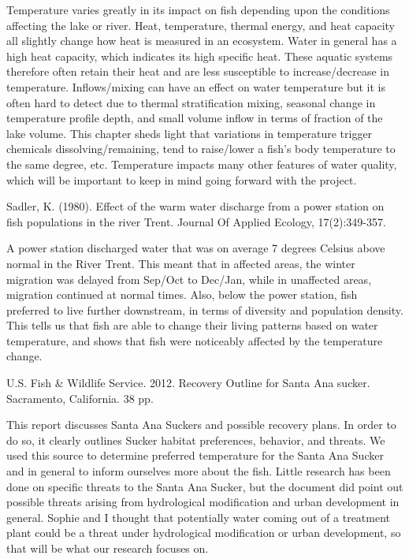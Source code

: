 \documentclass{article}
\begin{document}
Temperature varies greatly in its impact on fish depending upon the conditions affecting the lake or river. Heat, temperature, thermal energy, and heat capacity all slightly change how heat is measured in an ecosystem. Water in general has a high heat capacity, which indicates its high specific heat. These aquatic systems therefore often retain their heat and are less susceptible to increase/decrease in temperature. Inflows/mixing can have an effect on water temperature but it is often hard to detect due to thermal stratification mixing, seasonal change in temperature profile depth, and small volume inflow in terms of fraction of the lake volume. This chapter sheds light that variations in temperature trigger chemicals dissolving/remaining, tend to raise/lower a fish’s body temperature to the same degree, etc. Temperature impacts many other features of water quality, which will be important to keep in mind going forward with the project.

Sadler, K. (1980). Effect of the warm water discharge from a power station on fish populations in the river Trent. Journal Of Applied Ecology, 17(2):349-357.

A power station discharged water that was on average 7 degrees Celsius above normal in the River Trent. This meant that in affected areas, the winter migration was delayed from Sep/Oct to Dec/Jan, while in unaffected areas, migration continued at normal times. Also, below the power station, fish preferred to live further downstream, in terms of diversity and population density. This tells us that fish are able to change their living patterns based on water temperature, and shows that fish were noticeably affected by the temperature change. 

U.S. Fish \& Wildlife Service. 2012. Recovery Outline for Santa Ana sucker. Sacramento, California. 38 pp.

This report discusses Santa Ana Suckers and possible recovery plans. In order to do so, it clearly outlines Sucker habitat preferences, behavior, and threats. We used this source to determine preferred temperature for the Santa Ana Sucker and in general to inform ourselves more about the fish. Little research has been done on specific threats to the Santa Ana Sucker, but the document did point out possible threats arising from hydrological modification and urban development in general. Sophie and I thought that potentially water coming out of a treatment plant could be a threat under hydrological modification or urban development, so that will be what our research focuses on.
\end{document}
